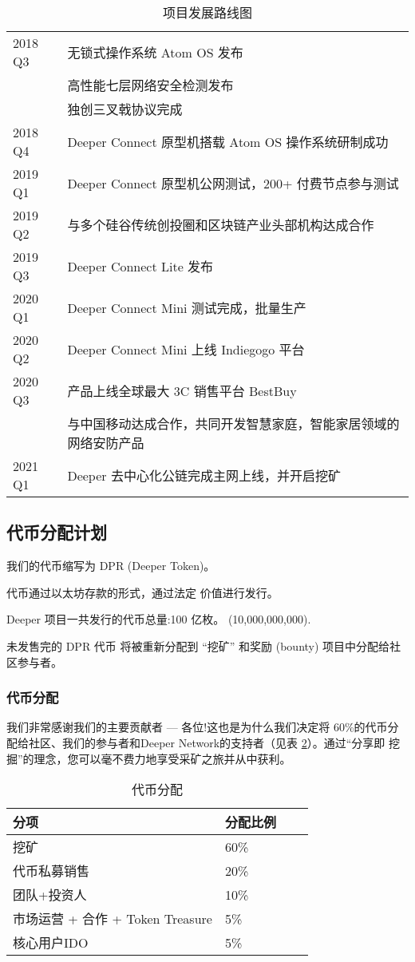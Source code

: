 \documentclass[a4paper]{article}
\begin{document}
\begin{table} [hh]
\centering
\begin{tabular}{|l|p{12cm}|}
\hline
2018 Q3		& 无锁式操作系统 Atom OS 发布 \\
& 高性能七层网络安全检测发布 \\
& 独创三叉戟协议完成	 \\ \hline
2018 Q4		& Deeper Connect 原型机搭载 Atom OS 操作系统研制成功 \\ \hline
2019 Q1		& Deeper Connect 原型机公网测试，200+ 付费节点参与测试 \\ \hline
2019 Q2		& 与多个硅谷传统创投圈和区块链产业头部机构达成合作\\ \hline
2019 Q3		& Deeper Connect Lite 发布\\ \hline
2020 Q1    & Deeper Connect Mini 测试完成，批量生产\\ \hline
2020 Q2		& Deeper Connect Mini 上线 Indiegogo 平台 \\ \hline
2020 Q3		& 产品上线全球最大 3C 销售平台 BestBuy \\
& 与中国移动达成合作，共同开发智慧家庭，智能家居领域的网络安防产品\\ \hline
2021 Q1		& Deeper 去中心化公链完成主网上线，并开启挖矿\\ \hline
\end{tabular}
\caption{项目发展路线图} \label{tab:roadmap}
\end{table}

\subsection{代币分配计划}
我们的代币缩写为 DPR (Deeper Token)。

\noindent 代币通过以太坊存款的形式，通过法定
价值进行发行。

\noindent Deeper 项目一共发行的代币总量:100 亿枚。 (10,000,000,000).

\noindent 未发售完的 DPR 代币 将被重新分配到 “挖矿” 和奖励 (bounty) 项目中分配给社区参与者。

\subsubsection{代币分配}

我们非常感谢我们的主要贡献者 --- 各位!这也是为什么我们决定将 60\%的代币分配给社区、我们的参与者和Deeper Network的支持者（见表 \ref{tab:token-matrix}）。通过“分享即 挖掘”的理念，您可以毫不费力地享受采矿之旅并从中获利。

\begin{table} [hh]
\centering
\begin{tabular}{|l|l|l|p{9cm}|}
\hline
分项 & 分配比例 \\ \hline
挖矿 & 60\% \\ \hline
代币私募销售 & 20\% \\ \hline
团队+投资人 & 10\%	\\ \hline

市场运营 + 合作 + Token Treasure & 5\% \\ \hline
核心用户IDO & 5\% \\ \hline
\end{tabular}
\caption{代币分配} \label{tab:token-matrix}
\end{table}
\end{document}
